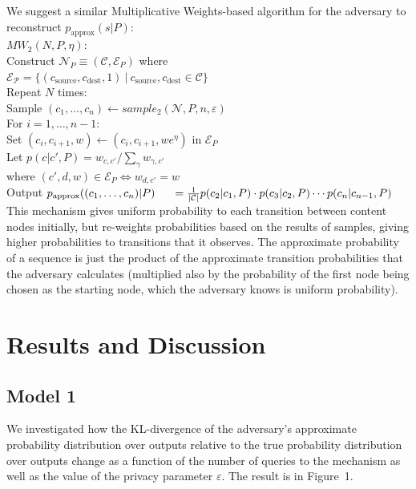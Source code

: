 \documentclass[preprint2]{aastex}
\begin{document}
We suggest a similar Multiplicative Weights-based algorithm for the adversary to reconstruct \(p_\text{approx}(s|P)\): \\

\noindent \(MW_2(N, P, \eta):\)\\
\indent Construct \(\mathcal{N}_P \equiv (\mathcal{C}, \mathcal{E}_P)\) where \\
\indent  \(\mathcal{E_P} = \{(c_\text{source}, c_\text{dest}, 1) \ | \ c_\text{source}, c_\text{dest} \in \mathcal{C}\}\) \\
\indent Repeat \(N\) times:\\
\indent \indent Sample \((c_1, \dots, c_n) \leftarrow sample_2(\mathcal{N}, P, n, \varepsilon)\) \\
\indent \indent For \(i = 1, \dots, n-1\): \\
\indent \indent \indent Set \((c_i, c_{i+1}, w) \leftarrow (c_i, c_{i+1}, we^\eta)\) in \(\mathcal{E}_P\)\\
\indent Let \(p(c|c',P) = w_{c, c'} / \sum_\gamma w_{\gamma, c'}\)\\
\indent where \((c', d, w) \in \mathcal{E}_P \Leftrightarrow w_{d, c'} = w\) \\
\indent Output \(p_\text{approx}((c_1, \dots, c_n) | P) \\
\indent = \frac{1}{|\mathcal{C}|} p(c_2|c_1,P) \cdot p(c_3|c_2,P) \cdots p(c_n | c_{n-1}, P)\) \\

This mechanism gives uniform probability to each transition between content nodes initially, but re-weights probabilities based on the results of samples, giving higher probabilities to transitions that it observes. The approximate probability of a sequence is just the product of the approximate transition probabilities that the adversary calculates (multiplied also by the probability of the first node being chosen as the starting node, which the adversary knows is uniform probability).

\section {Results and Discussion}

\subsection{Model 1}

We investigated how the KL-divergence of the adversary's approximate probability distribution over outputs relative to the true probability distribution over outputs change as a function of the number of queries to the mechanism as well as the value of the privacy parameter \(\varepsilon\). The result is in Figure~1.
\end{document}
